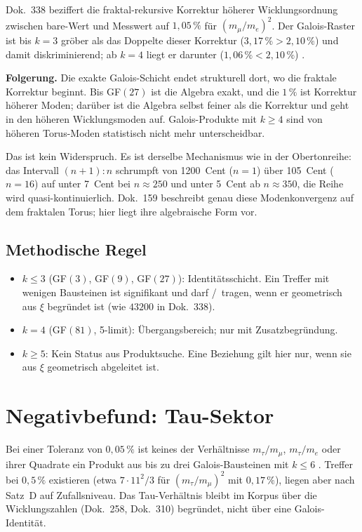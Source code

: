 Dok.~338 beziffert die fraktal-rekursive Korrektur höherer Wicklungsordnung
zwischen bare-Wert und Messwert auf $1{,}05\,\%$ für $(m_\mu/m_e)^2$. Der
Galois-Raster ist bis $k = 3$ gröber als das Doppelte dieser Korrektur
($3{,}17\,\% > 2{,}10\,\%$) und damit diskriminierend; ab $k = 4$ liegt er darunter
($1{,}06\,\% < 2{,}10\,\%$) \BM.

\textbf{Folgerung.} Die exakte Galois-Schicht endet strukturell dort, wo die
fraktale Korrektur beginnt. Bis GF$(27)$ ist die Algebra exakt, und die
$1\,\%$ ist Korrektur höherer Moden; darüber ist die Algebra selbst feiner als die
Korrektur und geht in den höheren Wicklungsmoden auf. Galois-Produkte mit
$k \geq 4$ sind von höheren Torus-Moden statistisch nicht mehr unterscheidbar.

Das ist kein Widerspruch. Es ist derselbe Mechanismus wie in der Obertonreihe:
das Intervall $(n{+}1) : n$ schrumpft von 1200~Cent ($n=1$) über 105~Cent ($n=16$)
auf unter 7~Cent bei $n \approx 250$ und unter 5~Cent ab $n \approx 350$, die Reihe wird quasi-kontinuierlich.
Dok.~159 beschreibt genau diese Modenkonvergenz auf dem fraktalen Torus; hier
liegt ihre algebraische Form vor.

\subsection{Methodische Regel}

\begin{itemize}
  \item $k \leq 3$ (GF$(3)$, GF$(9)$, GF$(27)$): Identitätsschicht. Ein Treffer
        mit wenigen Bausteinen ist signifikant und darf \KM/\BM\ tragen, wenn er
        geometrisch aus $\xi$ begründet ist (wie $43200$ in Dok.~338).
  \item $k = 4$ (GF$(81)$, 5-limit): Übergangsbereich; nur mit Zusatzbegründung.
  \item $k \geq 5$: Kein Status aus Produktsuche. Eine Beziehung gilt hier nur,
        wenn sie aus $\xi$ geometrisch abgeleitet ist.
\end{itemize}

\section{Negativbefund: Tau-Sektor}

Bei einer Toleranz von $0{,}05\,\%$ ist keines der Verhältnisse $m_\tau/m_\mu$,
$m_\tau/m_e$ oder ihrer Quadrate ein Produkt aus bis zu drei Galois-Bausteinen
mit $k \leq 6$ \SM. Treffer bei $0{,}5\,\%$ existieren (etwa $7 \cdot 11^2/3$ für
$(m_\tau/m_\mu)^2$ mit $0{,}17\,\%$), liegen aber nach Satz~D auf Zufallsniveau.
Das Tau-Verhältnis bleibt im Korpus über die Wicklungszahlen (Dok.~258, Dok.~310)
begründet, nicht über eine Galois-Identität.

